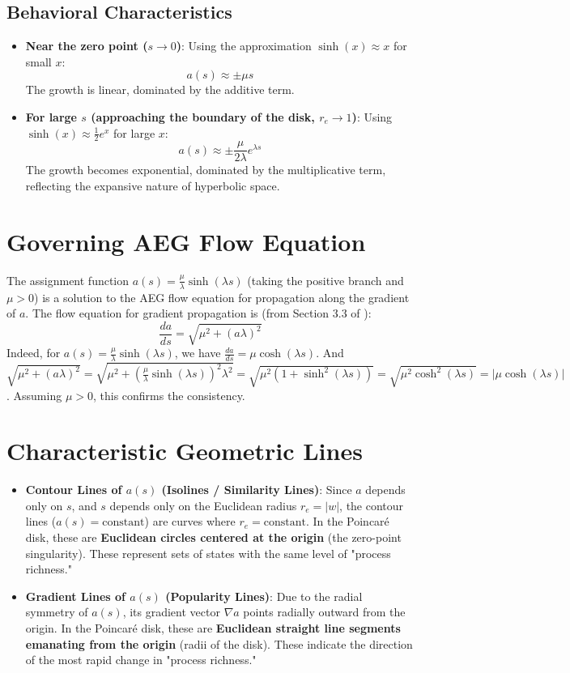 \documentclass[12pt]{article}
\begin{document}
\subsection{Behavioral Characteristics}
\begin{itemize}
    \item \textbf{Near the zero point ($s \to 0$)}: Using the approximation $\sinh(x) \approx x$ for small $x$:
    $$ a(s) \approx \pm \mu s $$
    The growth is linear, dominated by the additive term.
    \item \textbf{For large $s$ (approaching the boundary of the disk, $r_e \to 1$)}: Using $\sinh(x) \approx \frac{1}{2}e^x$ for large $x$:
    $$ a(s) \approx \pm \frac{\mu}{2\lambda} e^{\lambda s} $$
    The growth becomes exponential, dominated by the multiplicative term, reflecting the expansive nature of hyperbolic space.
\end{itemize}

\section{Governing AEG Flow Equation}
The assignment function $a(s) = \frac{\mu}{\lambda} \sinh(\lambda s)$ (taking the positive branch and $\mu > 0$) is a solution to the AEG flow equation for propagation along the gradient of $a$. The flow equation for gradient propagation is (from Section 3.3 of \cite{YuanAEG2025}):
$$ \frac{da}{ds} = \sqrt{\mu^2 + (a\lambda)^2} $$
Indeed, for $a(s) = \frac{\mu}{\lambda} \sinh(\lambda s)$, we have $\frac{da}{ds} = \mu \cosh(\lambda s)$.
And $\sqrt{\mu^2 + (a\lambda)^2} = \sqrt{\mu^2 + \left(\frac{\mu}{\lambda}\sinh(\lambda s)\right)^2 \lambda^2} = \sqrt{\mu^2(1+\sinh^2(\lambda s))} = \sqrt{\mu^2\cosh^2(\lambda s)} = |\mu\cosh(\lambda s)|$.
Assuming $\mu > 0$, this confirms the consistency.

\section{Characteristic Geometric Lines}
\begin{itemize}
    \item \textbf{Contour Lines of $a(s)$ (Isolines / Similarity Lines)}:
    Since $a$ depends only on $s$, and $s$ depends only on the Euclidean radius $r_e = |w|$, the contour lines ($a(s) = \text{constant}$) are curves where $r_e = \text{constant}$.
    In the Poincaré disk, these are \textbf{Euclidean circles centered at the origin} (the zero-point singularity). These represent sets of states with the same level of "process richness."
    \item \textbf{Gradient Lines of $a(s)$ (Popularity Lines)}:
    Due to the radial symmetry of $a(s)$, its gradient vector $\nabla a$ points radially outward from the origin.
    In the Poincaré disk, these are \textbf{Euclidean straight line segments emanating from the origin} (radii of the disk). These indicate the direction of the most rapid change in "process richness."
\end{itemize}
\end{document}

